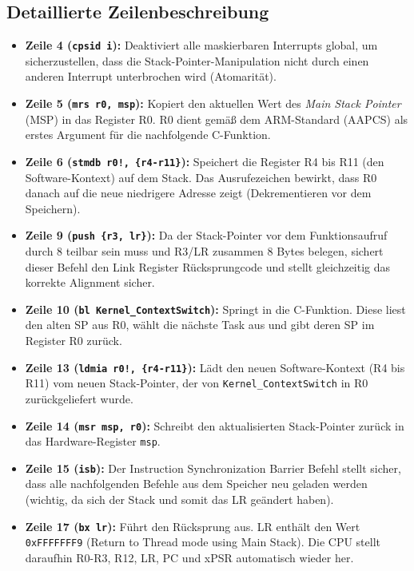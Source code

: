 \subsection{Detaillierte Zeilenbeschreibung}
\begin{itemize}
    \item \textbf{Zeile 4 (\lstinline|cpsid i|):} Deaktiviert alle maskierbaren Interrupts global, um sicherzustellen, dass die Stack-Pointer-Manipulation nicht durch einen anderen Interrupt unterbrochen wird (Atomarität).
    \item \textbf{Zeile 5 (\lstinline|mrs r0, msp|):} Kopiert den aktuellen Wert des \textit{Main Stack Pointer} (MSP) in das Register R0. R0 dient gemäß dem ARM-Standard (AAPCS) als erstes Argument für die nachfolgende C-Funktion.
    \item \textbf{Zeile 6 (\lstinline|stmdb r0!, {r4-r11}|):} Speichert die Register R4 bis R11 (den Software-Kontext) auf dem Stack. Das Ausrufezeichen bewirkt, dass R0 danach auf die neue niedrigere Adresse zeigt (Dekrementieren vor dem Speichern).
    \item \textbf{Zeile 9 (\lstinline|push {r3, lr}|):} Da der Stack-Pointer vor dem Funktionsaufruf durch 8 teilbar sein muss und R3/LR zusammen 8 Bytes belegen, sichert dieser Befehl den Link Register Rücksprungcode und stellt gleichzeitig das korrekte Alignment sicher.
    \item \textbf{Zeile 10 (\lstinline|bl Kernel_ContextSwitch|):} Springt in die C-Funktion. Diese liest den alten SP aus R0, wählt die nächste Task aus und gibt deren SP im Register R0 zurück.
    \item \textbf{Zeile 13 (\lstinline|ldmia r0!, {r4-r11}|):} Lädt den neuen Software-Kontext (R4 bis R11) vom neuen Stack-Pointer, der von \lstinline|Kernel_ContextSwitch| in R0 zurückgeliefert wurde.
    \item \textbf{Zeile 14 (\lstinline|msr msp, r0|):} Schreibt den aktualisierten Stack-Pointer zurück in das Hardware-Register \lstinline|msp|.
    \item \textbf{Zeile 15 (\lstinline|isb|):} Der Instruction Synchronization Barrier Befehl stellt sicher, dass alle nachfolgenden Befehle aus dem Speicher neu geladen werden (wichtig, da sich der Stack und somit das LR geändert haben).
    \item \textbf{Zeile 17 (\lstinline|bx lr|):} Führt den Rücksprung aus. LR enthält den Wert \lstinline|0xFFFFFFF9| (Return to Thread mode using Main Stack). Die CPU stellt daraufhin R0-R3, R12, LR, PC und xPSR automatisch wieder her.
\end{itemize}

